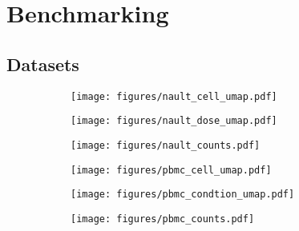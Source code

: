 \chapter{Benchmarking}
\label{ch:chapter1}


\section{Datasets}

\begin{figure}[h]
    \centering
    \begin{subfigure}[t]{0.49\textwidth}
        \centering
        \texttt{[image: figures/nault\_cell\_umap.pdf]}
        \caption{}
        \label{fig:figure1}
    \end{subfigure}%
    \hfill %
    \begin{subfigure}[t]{0.49\textwidth}
        \centering
        \texttt{[image: figures/nault\_dose\_umap.pdf]}
        \caption{}
        \label{fig:figure2}
    \end{subfigure}%
    \hfill %
    \begin{subfigure}[b]{\textwidth}
        \centering
        \texttt{[image: figures/nault\_counts.pdf]}
        \caption{}
        \label{fig:figure3}
    \end{subfigure}
    \caption{}
    \label{fig:combined}
\end{figure}


\begin{figure}[h]
    \centering
    \begin{subfigure}[t]{0.49\textwidth}
        \centering
        \texttt{[image: figures/pbmc\_cell\_umap.pdf]}
        \caption{}
        \label{fig:figure1}
    \end{subfigure}%
    \hfill %
    \begin{subfigure}[t]{0.49\textwidth}
        \centering
        \texttt{[image: figures/pbmc\_condtion\_umap.pdf]}
        \caption{}
        \label{fig:figure2}
    \end{subfigure}%
    \hfill %
    \begin{subfigure}[b]{\textwidth}
        \centering
        \texttt{[image: figures/pbmc\_counts.pdf]}
        \caption{}
        \label{fig:figure3}
    \end{subfigure}
    \caption{}
    \label{fig:combined}
\end{figure}